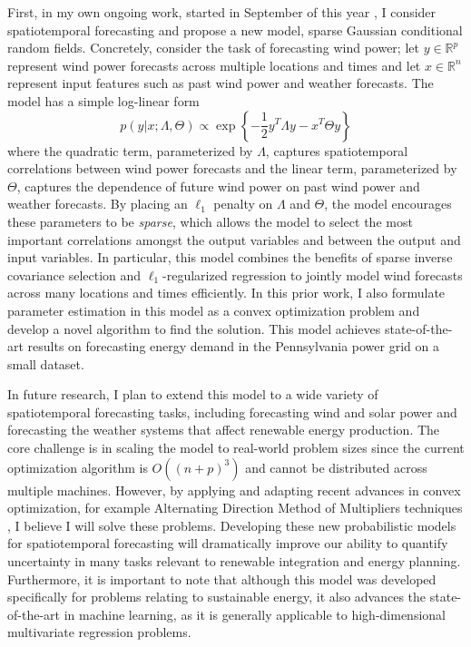 \documentclass[12pt]{article}
\begin{document}
First, in my own ongoing work, started in September of this year \cite{wytock.12}, I consider spatiotemporal forecasting and propose a new model, sparse Gaussian conditional random fields. Concretely, consider the task of forecasting wind power; let $y \in \mathbb{R}^p$ represent wind power forecasts across multiple locations and times and let $x \in \mathbb{R}^n$ represent input features such as past wind power and weather forecasts. The model has a simple log-linear form
\begin{equation}
p(y|x;\Lambda,\Theta) \propto \exp \left\{ -\frac{1}{2}y^T\Lambda y - x^T\Theta y \right\}
\end{equation}
where the quadratic term, parameterized by $\Lambda$, captures spatiotemporal correlations between wind power forecasts and the linear term, parameterized by $\Theta$, captures the dependence of future wind power on past wind power and weather forecasts. By placing an $\ell_1$ penalty on $\Lambda$ and $\Theta$, the model encourages these parameters to be \emph{sparse}, which allows the model to select the most important correlations amongst the output variables and between the output and input variables. In particular, this model combines the benefits of sparse inverse covariance selection \cite{banerjee.08} and $\ell_1$-regularized regression to jointly model wind forecasts across many locations and times efficiently. In this prior work, I also formulate parameter estimation in this model as a convex optimization problem and develop a novel algorithm to find the solution. This model achieves state-of-the-art results on forecasting energy demand in the Pennsylvania power grid on a small dataset.

In future research, I plan to extend this model to a wide variety of spatiotemporal forecasting tasks, including forecasting wind and solar power and forecasting the weather systems that affect renewable energy production. The core challenge is in scaling the model to real-world problem sizes since the current optimization algorithm is $O((n+p)^3)$ and cannot be distributed across multiple machines. However, by applying and adapting recent advances in convex optimization, for example Alternating Direction Method of Multipliers techniques \cite{boyd.11}, I believe I will solve these problems. Developing these new probabilistic models for spatiotemporal forecasting will dramatically improve our ability to quantify uncertainty in many tasks relevant to renewable integration and energy planning. Furthermore, it is important to note that although this model was developed specifically for problems relating to sustainable energy, it also advances the state-of-the-art in machine learning, as it is generally applicable to high-dimensional multivariate regression problems.
\end{document}
